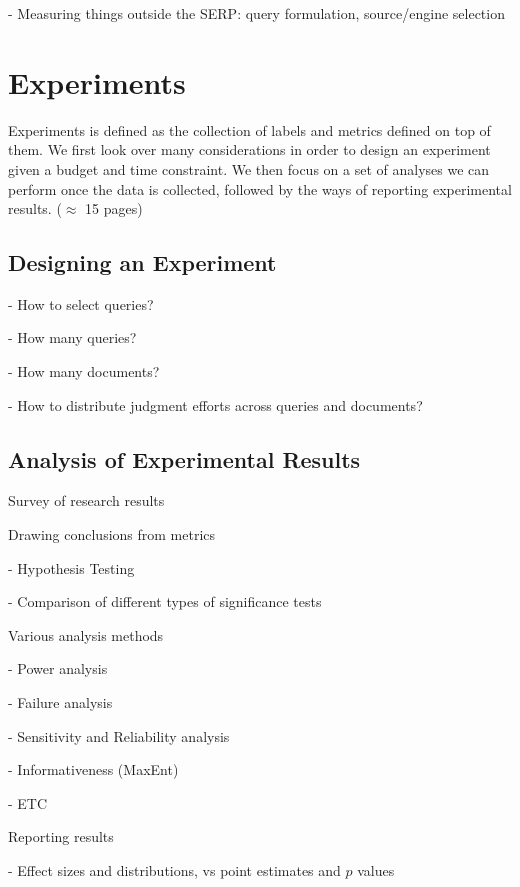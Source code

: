 \documentclass[openany]{now} %
\newcommand{\newpar}{\bigskip\noindent}
\begin{document}
- Measuring things outside the SERP: query formulation, source/engine selection

\chapter{Experiments}
\label{c-experiment}

Experiments is defined as the collection of labels and metrics defined on top of them. We first look over many considerations in order to design an experiment given a budget and time constraint. We then focus on a set of analyses we can perform once the data is collected, followed by the ways of reporting experimental results. (\ensuremath{\approx} 15 pages)

\section{Designing an Experiment}

- How to select queries?

- How many queries? \cite{Sakai:2014}

- How many documents? \cite{CarterettePFK09}

- How to distribute judgment efforts across queries and documents? \cite{CarterettePKAA09, YilmazR09}


\section{Analysis of Experimental Results}

Survey of research results \cite{Sakai:2016}

Drawing conclusions from metrics 

- Hypothesis Testing \cite{Dincer:2014}

- Comparison of different types of significance tests \cite{SmuckerAC09}

\newpar
Various analysis methods

- Power analysis \cite{Sakai:2014}

- Failure analysis

- Sensitivity and Reliability analysis \cite{Urbano:2013} 

- Informativeness (MaxEnt) \cite{AslamYP05}

- ETC \cite{Bron:2013} \cite{Boytsov:2013}  \cite{Robertson:2012}

\newpar
Reporting results

- Effect sizes and distributions, vs point estimates and $p$ values
\end{document}
